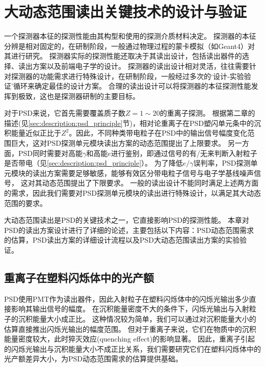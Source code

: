 \chapter{大动态范围读出关键技术的设计与验证}
\label{ch:large_dynmaicrange}
一个探测器本征的探测性能由其构型和使用的探测介质材料决定。
探测器的本征分辨是相对固定的，在研制阶段，一般通过物理过程的蒙卡模拟（如Geant4）对其进行研究。
探测器实际的探测性能还取决于其读出设计，包括读出器件的选择、读出方案以及前端电子学的设计。
探测器的读出设计相对灵活，往往需要针对探测器的功能需求进行特殊设计，在研制阶段，一般经过多次的‘设计-实验验证’循环来确定最佳的设计方案。
合理的读出设计可以将探测器的本征探测性能发挥到极致，这也是探测器研制的主要目标。

对于PSD来说，它首先需要覆盖质子数$Z=1 \sim 20$的重离子探测。
根据第二章的描述(见\ref{sec:description:psd_principle}节)，相对论重离子在PSD塑闪单元条中的沉积能量近似正比于$Z^2$。因此，不同种类带电粒子在PSD中的输出信号幅度变化范围巨大，这对PSD探测单元模块读出方案的动态范围提出了上限要求。
另一方面，PSD同时需要对高能$\gamma$和高能$e$进行鉴别，即通过信号的有/无来判断入射粒子是否带电（见\ref{sec:description:psd_principle}）。
为了降低$e/\gamma$误判率，PSD探测单元模块的读出方案需要足够敏感，能够有效区分带电粒子信号与电子学基线噪声信号，
这对其动态范围提出了下限要求。
一般的读出设计不能同时满足上述两方面的需求，因此我们需要对PSD探测单元模块的读出进行特殊设计，以满足其大动态范围的要求。

大动态范围读出是PSD的关键技术之一，它直接影响PSD的探测性能。
本章对PSD的读出方案设计进行了详细的论述，主要包括以下内容：PSD动态范围需求的估算，PSD读出方案的详细设计流程以及PSD大动态范围读出方案的实验验证。


\section{重离子在塑料闪烁体中的光产额}
\label{sec:dynamic_range:light_yield}
PSD使用PMT作为读出器件，因此入射粒子在塑料闪烁体中的闪烁光输出多少直接影响其输出信号的幅度。
在沉积能量密度不大的条件下，闪烁光输出与入射粒子的沉积能量大小成正比。
这种情况较为简单，我们可以通过对沉积能量大小的估算直接推出闪烁光输出的幅度范围。
但对于重离子来说，它们在物质中的沉积能量密度较大，此时猝灭效应\parencite{birks_book_2013}(quenching effect)的影响显著。
因此，重离子引起的闪烁光输出与沉积能量大小不成正比关系，我们需要研究它们在塑料闪烁体中的光产额差异大小，为PSD动态范围需求的估算提供基础。

